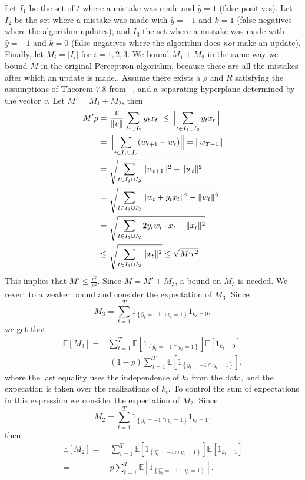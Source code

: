 \documentclass[12pt]{article}
\newcommand{\E}[0]{\mathbb{E}}
\begin{document}
Let $I_1$ be the set of $t$ where a mistake was made and
$\widehat{y}=1$ (false positives).  Let $I_2$ be the set where a mistake was made with
$\widehat{y} = -1$ and $k = 1$ (false negatives where the algorithm updates), and $I_3$ the set where a mistake was
made with $\widehat{y} = -1$ and $k = 0$ (false negatives where the algorithm does {\it not} make an update). Finally, let $M_i = |I_i|$ for $i =
1,2,3$. We bound $M_1 + M_2$ in the same way we bound $M$ in the original Perceptron algorithm, because these are all the mistakes after which an update is made.. Assume there exists a $\rho$ and $R$ satisfying the assumptions of Theorem 7.8 from ~\cite{FML}, and a separating hyperplane determined by the vector $v$. Let $M' = M_1 + M_2$, then
\begin{align*}
M' \rho =&\ \frac{v}{\|v\|}\sum_{I_1 \cup I_2} y_tx_t \
 \leq   \Bigl\|\sum_{t \in I_1 \cup I_2} y_t x_t\Bigr\| \\
=& \ \Bigl\|\sum_{t \in I_1 \cup I_2} (w_{t+1} - w_t) \Bigr\| 
=  \|w_{T+1} \| \\
=&\ \sqrt{\sum_{t \in I_1 \cup I_2} \|  w_{t+1}\|^2 - \|w_t\|^2 }\\
= &\ \sqrt{\sum_{t \in I_1 \cup I_2} \|  w_{t} + y_t x_t\|^2 - \|w_t\|^2 }\\
= &\ \sqrt{\sum_{t \in I_1 \cup I_2} 2y_t w_t\cdot x_t - \|x_t\|^2} \\
\leq &\ \sqrt{\sum_{t \in I_1 \cup I_2} \|x_t\|^2}
\leq \sqrt{M'r^2}.
\end{align*}
This implies that $M' \leq \frac{r^2}{\rho^2}$. Since $M = M' + M_3$, a bound on $M_3$ is needed. We revert to a weaker bound and consider the expectation of
$M_3$. Since 
\[M_3 = \sum_{t=1}^T 1_{\left\{\widehat{y}_t = -1 \cap y_t = 1\right\}}1_{k_t = 0}, \]
we get that
\begin{align*}
\E[M_3] = & \sum_{t=1}^T \E[1_{\left\{\widehat{y_t} = -1 \cap y_t = 1\right\}}]\E[1_{k_t = 0}] \\
 = &\ (1 - p)\sum_{t=1}^T \E[1_{\left\{\widehat{y_t} = -1 \cap y_t = 1\right\}}],
\end{align*}
where the last equality uses the independence of $k_t$ from the data, and the expecation is taken over the realizations of $k_t$. To control the sum of expectations in this expression we consider the expectation of $M_2$. Since
\[
M_2 =  \sum_{t=1}^T 1_{\left\{\hat{y_t} = -1 \cap y_t = 1\right\}}1_{k_t = 1},
\]
then
\begin{align*}
\E[M_2] =&\ \sum_{t=1}^T \E[1_{\left\{\hat{y_t} = -1 \cap y_t = 1\right\}}]\E[1_{k_t = 1}] \\
=&\ p\sum_{t=1}^T \E[1_{\left\{\hat{y_t} = -1 \cap y_t = 1\right\}}].
\end{align*}
\end{document}
